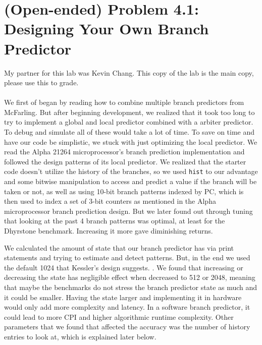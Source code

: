 \documentclass[11pt]{article}
\begin{document}
\section*{(Open-ended) Problem 4.1: Designing Your Own Branch Predictor}
My partner for this lab was Kevin Chang. This copy of the lab is the main copy, please use this to grade. \\ \\
We first of began by reading how to combine multiple branch predictors from McFarling. \cite{McFarling1993CombiningBP} But after beginning development, we realized that it took too long to try to implement a global and local predictor combined with a arbiter predictor. To debug and simulate all of these would take a lot of time. To save on time and have our code be simplistic, we stuck with just optimizing the local predictor. We read the Alpha 21264 microprocessor's branch prediction implementation and followed the design patterns of its local predictor. \cite{755465} We realized that the starter code doesn't utilize the history of the branches, so we used \verb|hist| to our advantage and some bitwise manipulation to access and predict a value if the branch will be taken or not, as well as using 10-bit branch patterns indexed by PC, which is then used to index a set of 3-bit counters as mentioned in the Alpha microprocessor branch prediction design. \cite{755465} But we later found out through tuning that looking at the past 4 branch patterns was optimal, at least for the Dhyrstone benchmark. Increasing it more gave diminishing returns.


We calculated the amount of state that our branch predictor has via print statements and trying to estimate and detect patterns. But, in the end we used the default 1024 that Kessler's design suggests. \cite{755465}. We found that increasing or decreasing the state has negligible effect when decreased to 512 or 2048, meaning that maybe the benchmarks do not stress the branch predictor state as much and it could be smaller. Having the state larger and implementing it in hardware would only add more complexity and latency. In a software branch predictor, it could lead to more CPI and higher algorithmic runtime complexity. Other parameters that we found that affected the accuracy was the number of history entries to look at, which is explained later below.
\end{document}
